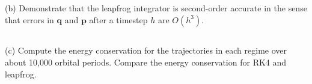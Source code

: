 \subsection{}
(b) Demonstrate that the leapfrog integrator is second-order accurate
in the sense that errors in $\mathbf{q}$ and $\mathbf{p}$ after a timestep $h$ are $O(h^3)$.



\subsection{}
(c) Compute the energy conservation for the trajectories in each regime
over about 10,000 orbital periods. Compare the energy conservation for RK4 and leapfrog.

\clearpage